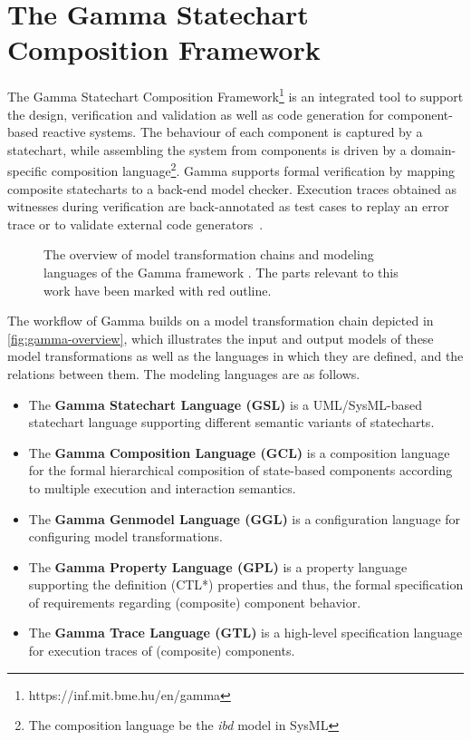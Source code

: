 \section{The Gamma Statechart Composition Framework}\label{sec:gamma}

The Gamma Statechart Composition Framework\footnote{https://inf.mit.bme.hu/en/gamma} \cite{mixed_statecharts_2020} is an integrated tool to support the design, verification and validation as well as code generation for component-based reactive systems. The behaviour of each component is captured by a statechart, while assembling the system from components is driven by a domain-specific composition language\footnote{The composition language be the \emph{ibd} model in SysML}. Gamma supports formal verification by mapping composite statecharts to a back-end model checker. Execution traces obtained as witnesses during verification are back-annotated as test cases to replay an error trace or to validate external code generators~\cite{molnar2018gamma}. 

\begin{figure}[!ht]
	\centering
	
	\caption{The overview of model transformation chains and modeling languages of the Gamma framework \cite{mixed_statecharts_2020}. The parts relevant to this work have been marked with red outline.}
	\label{fig:gamma-overview}
\end{figure}

The workflow of Gamma builds on a model transformation chain depicted in \autoref{fig:gamma-overview}, which illustrates the input and output models of these model transformations as well as the languages in which they are defined, and the relations between them. The modeling languages are as follows.

\begin{itemize}
	\item The \textbf{Gamma Statechart Language (GSL)} is a UML/SysML-based statechart language supporting different semantic variants of statecharts.
	\item The \textbf{Gamma Composition Language (GCL)} is a composition language for the formal hierarchical composition of state-based 	components according to multiple execution and interaction semantics.
	\item The \textbf{Gamma Genmodel Language (GGL)} is a configuration language for configuring model transformations.
	\item The \textbf{Gamma Property Language (GPL)} is a property language supporting the definition (CTL*) properties and thus, the formal specification of requirements regarding (composite)	component behavior.
	\item The \textbf{Gamma Trace Language (GTL)} is a high-level specification language for  execution traces of (composite) components.
\end{itemize}

